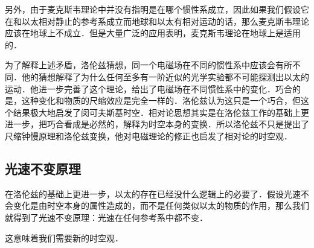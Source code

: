 另外，由于麦克斯韦理论中并没有指明是在哪个惯性系成立，因此如果我们假设它在和以太相对静止的参考系成立而地球和以太有相对运动的话，那么麦克斯韦理论应该在地球上不成立．但是大量广泛的应用表明，麦克斯韦理论在地球上是适用的．

为了解释上述矛盾，洛伦兹猜想，同一个电磁场在不同的惯性系中应该会有所不同．他的猜想解释了为什么任何至多有一阶近似的光学实验都不可能探测出以太的运动．他进一步完善了这个理论，给出了电磁场在不同惯性系中的变化．巧合的是，这种变化和物质的尺缩效应是完全一样的．洛伦兹认为这只是一个巧合，但这个结果极大地启发了闵可夫斯基时空．相对论思想其实是在洛伦兹工作的基础上更进一步，把巧合看成是必然的，解释为时空本身的变换．所以洛伦兹不只是提出了尺缩钟慢原理和洛伦兹变换，他对电磁理论的修正也启发了相对论的时空观．

\subsection{光速不变原理}

在洛伦兹的基础上更进一步，以太的存在已经没什么逻辑上的必要了．假设光速不会变化是由时空本身的属性造成的，而不是任何类似以太的物质的作用，那么我们就得到了光速不变原理：光速在任何参考系中都不变．

这意味着我们需要新的时空观．




